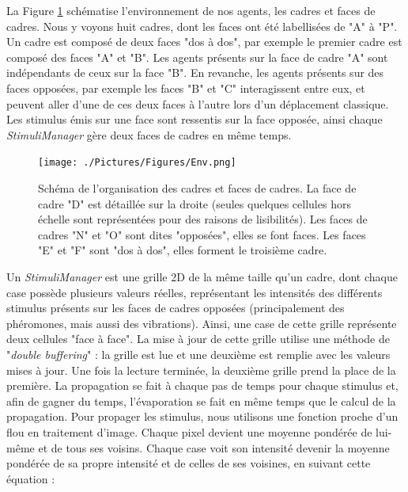 			La Figure \ref{Env} schématise l'environnement de nos agents, les cadres et faces de cadres. Nous y voyons huit cadres, dont les faces ont été labellisées de "A" à "P". Un cadre est composé de deux faces "dos à dos", par exemple le premier cadre est composé des faces "A" et "B". Les agents présents sur la face de cadre "A" sont indépendants de ceux sur la face "B". En revanche, les agents présents sur des faces opposées, par exemple les faces "B" et "C" interagissent entre eux, et peuvent aller d'une de ces deux faces à l'autre lors d'un déplacement classique. Les stimulus émis sur une face sont ressentis sur la face opposée, ainsi chaque \textit{StimuliManager} gère deux faces de cadres en même temps.
			\begin{figure}
			\centering
			\texttt{[image: ./Pictures/Figures/Env.png]}
			\caption[Schéma vu de côté de l'organisation des cadres et faces de cadres.]{Schéma de l'organisation des cadres et faces de cadres. La face de cadre "D" est détaillée sur la droite (seules quelques cellules hors échelle sont représentées pour des raisons de lisibilités). Les faces de cadres "N" et "O" sont dites "opposées", elles se font faces. Les faces "E" et "F" sont "dos à dos", elles forment le troisième cadre.}
			\label{Env}
			\end{figure}
			
			
			Un \textit{StimuliManager} est une grille 2D de la même taille qu'un cadre, dont chaque case possède plusieurs valeurs réelles, représentant les intensités des différents stimulus présents sur les faces de cadres opposées (principalement des phéromones, mais aussi des vibrations). Ainsi, une case de cette grille représente deux cellules "face à face". La mise à jour de cette grille utilise une méthode de "\textit{double buffering}" : la grille est lue et une deuxième est remplie avec les valeurs mises à jour. Une fois la lecture terminée, la deuxième grille prend la place de la première. La propagation se fait à chaque pas de temps pour chaque stimulus et, afin de gagner du temps, l'évaporation se fait en même temps que le calcul de la propagation. Pour propager les stimulus, nous utilisons une fonction proche d'un flou en traitement d'image. Chaque pixel devient une moyenne pondérée de lui-même et de tous ses voisins. Chaque case voit son intensité devenir la moyenne pondérée de sa propre intensité et de celles de ses voisines, en suivant cette équation :
			
